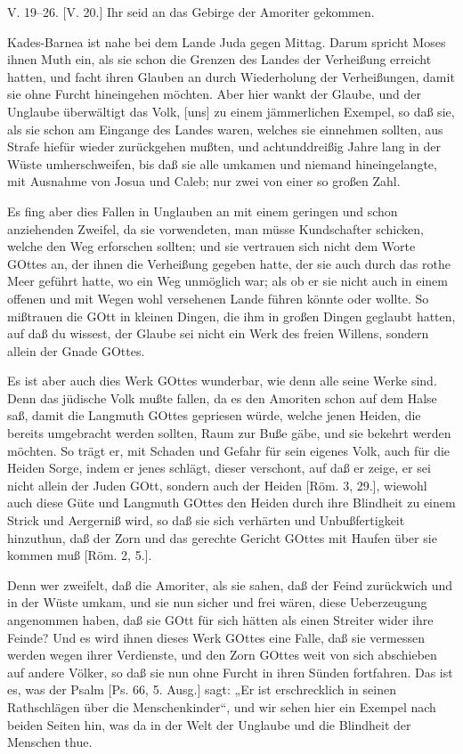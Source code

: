 \begin{schriftzitat}
V. 19–26. [V. 20.] Ihr seid an das Gebirge der Amoriter gekommen.
\end{schriftzitat}

Kades-Barnea ist nahe bei dem Lande Juda gegen Mittag. Darum spricht Moses ihnen Muth ein, als sie schon die Grenzen des Landes der Verheißung erreicht hatten, und facht ihren Glauben an durch Wiederholung der Verheißungen, damit sie ohne Furcht hineingehen möchten. Aber hier wankt der Glaube, und der Unglaube überwältigt das Volk, [uns] zu einem jämmerlichen Exempel, so daß sie, als sie schon am Eingange des Landes waren, welches sie einnehmen sollten, aus Strafe hiefür wieder zurückgehen mußten, und achtunddreißig Jahre lang in der Wüste umherschweifen, bis daß sie alle umkamen und niemand hineingelangte, mit Ausnahme von Josua und Caleb; nur zwei von einer so großen Zahl.

Es fing aber dies Fallen in Unglauben an mit einem geringen und schon anziehenden Zweifel, da sie vorwendeten, man müsse Kundschafter schicken, welche den Weg erforschen sollten; und sie vertrauen sich nicht dem Worte GOttes an, der ihnen die Verheißung gegeben hatte, der sie auch durch das rothe Meer geführt hatte, wo ein Weg unmöglich war; als ob er sie nicht auch in einem offenen und mit Wegen wohl versehenen Lande führen könnte oder wollte. So mißtrauen die GOtt in kleinen Dingen, die ihm in großen Dingen geglaubt hatten, auf daß du wissest, der Glaube sei nicht ein Werk des freien Willens, sondern allein der Gnade GOttes.

Es ist aber auch dies Werk GOttes wunderbar, wie denn alle seine Werke sind. Denn das jüdische Volk mußte fallen, da es den Amoriten schon auf dem Halse saß, damit die Langmuth GOttes gepriesen würde, welche jenen Heiden, die bereits umgebracht werden sollten, Raum zur Buße gäbe, und sie bekehrt werden möchten. So trägt er, mit Schaden und Gefahr für sein eigenes Volk, auch für die Heiden Sorge, indem er jenes schlägt, dieser verschont, auf daß er zeige, er sei nicht allein der Juden GOtt, sondern auch der Heiden [Röm. 3, 29.], wiewohl auch diese Güte und Langmuth GOttes den Heiden durch ihre Blindheit zu einem Strick und Aergerniß wird, so daß sie sich verhärten und Unbußfertigkeit hinzuthun, daß der Zorn und das gerechte Gericht GOttes mit Haufen über sie kommen muß [Röm. 2, 5.].

Denn wer zweifelt, daß die Amoriter, als sie sahen, daß der Feind zurückwich und in der Wüste umkam, und sie nun sicher und frei wären, diese Ueberzeugung angenommen haben, daß sie GOtt für sich hätten als einen Streiter wider ihre Feinde? Und es wird ihnen dieses Werk GOttes eine Falle, daß sie vermessen werden wegen ihrer Verdienste, und den Zorn GOttes weit
von sich abschieben auf andere Völker, so daß sie nun ohne Furcht in ihren Sünden fortfahren. Das ist es, was der Psalm [Ps. 66, 5. Ausg.] sagt: „Er ist erschrecklich in seinen Rathschlägen über die Menschenkinder“, und wir sehen hier ein Exempel nach beiden Seiten hin, was da in der Welt der Unglaube und die Blindheit der Menschen thue.

